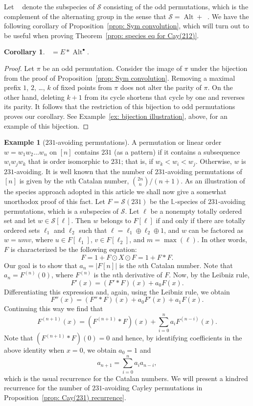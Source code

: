 \documentclass[a4paper, 11pt]{article}
\newcommand{\LL}{\mathbb{L}}
\DeclareMathOperator{\Alt}{Alt}
\DeclareMathOperator{\AltC}{\overline{\Alt}}
\newcommand{\Sym}{\mathcal{S}}
\theoremstyle{definition}
\newtheorem{corollary}[theorem]{Corollary}
\newtheorem{example}[theorem]{Example}
\begin{document}
Let $\AltC$ denote the subspecies of $\Sym$ consisting of the odd
permutations, which is the complement of the alternating group in the
sense that $\Sym=\Alt+\AltC$. We have the following corollary of 
Proposition~\ref{prop: Sym convolution}, which will turn out to be useful when 
proving Theorem~\ref{prop: species eq for Cay(212)}.

\begin{corollary}\label{cor:X}
  $\AltC = E*\Alt^{\bullet}$.
\end{corollary}

\begin{proof}
  Let $\pi$ be an odd permutation. Consider the image of $\pi$ under the
  bijection from the proof of Proposition~\ref{prop: Sym convolution}.
  Removing a maximal prefix $1$, $2$, \dots, $k$ of fixed points from
  $\pi$ does not alter the parity of $\pi$. On the other hand, deleting
  $k+1$ from its cycle shortens that cycle by one and reverses its parity.
  It follows that the restriction of this bijection to odd permutations
  proves our corollary. See Example~\ref{ex: bijection illustration},
  above, for an example of this bijection.
\end{proof}

\begin{example}[$231$-avoiding permutations]\label{ex:catalan species}
  A permutation or linear order $w=w_1w_2\ldots w_n$ on $[n]$
  contains $231$ (as a pattern) if it contains a subsequence $w_iw_jw_k$
  that is order isomorphic to $231$; that is, if
  $w_k<w_i<w_j$. Otherwise, $w$ is $231$-avoiding.
  It is well known that the number of $231$-avoiding permutations of $[n]$ is given
  by the $n$th Catalan number, $\binom{2n}{n}/(n+1)$. As an illustration
  of the species approach adopted in this article we shall now give a
  somewhat unorthodox proof of this fact.
  Let $F=\Sym(231)$ be the $\LL$-species of $231$-avoiding permutations, 
  which is a subspecies of $\Sym$.
  Let $\ell$ be a nonempty totally ordered set and let
  $w\in\Sym[\ell]$. Then $w$ belongs to $F[\ell]$ if and only if there
  are totally ordered sets $\ell_1$ and $\ell_2$ such that
  $\ell=\ell_1\oplus\ell_2\oplus 1$, and $w$ can be factored as $w=umv$,
  where $u\in F[\ell_1]$, $v\in F[\ell_2]$, and $m=\max(\ell)$. In other
  words, $F$ is characterized be the following equation:
  \[
    F=1+F\odot X \odot F = 1+F*F.
  \]
  Our goal is to show that $a_n=|F[n]|$ is the $n$th Catalan
  number. Note that $a_n = F^{(n)}(0)$, where $F^{(n)}$ is the $n$th
  derivative of $F$. Now, by the Leibniz rule,
  \[
    F'(x) = (F'*F)(x) + a_0F(x).
  \]
  Differentiating this expression and, again, using the Leibniz rule,
  we obtain
  \[
    F''(x) = (F''*F)(x) + a_0F'(x)+a_1F(x).
  \]
  Continuing this way we find that
  \[
    F^{(n+1)}(x) = (F^{(n+1)}*F)(x) + \sum_{i=0}^na_iF^{(n-i)}(x).
  \]
  Note that $(F^{(n+1)}*F)(0)=0$ and hence, by identifying coefficients in the
  above identity when $x=0$, we obtain $a_0=1$ and
  \[
    a_{n+1}=\sum_{i=0}^na_ia_{n-i},
  \]
  which is the usual recurrence for the Catalan numbers. We will present a
  kindred recurrence for the number of $231$-avoiding Cayley permutations in
  Proposition~\ref{prop: Cay(231) recurrence}.
\end{example}
\end{document}
